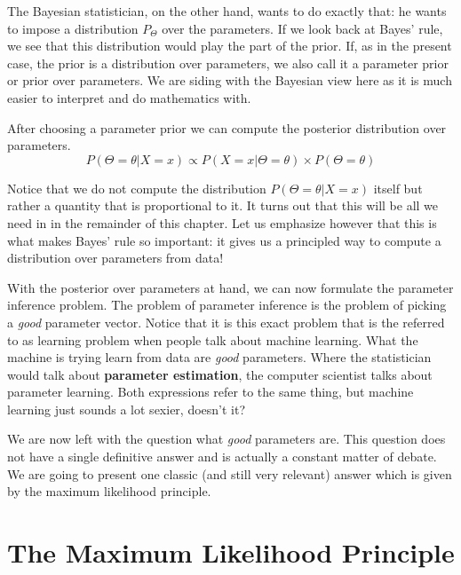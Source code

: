 The Bayesian statistician, on the other hand, wants to do exactly that: he wants to impose a distribution $ P_{\Theta} $ over the parameters. 
If we look back at Bayes' rule, we see that this distribution would play the part of the prior. If, as in the present case, the prior is a distribution over parameters,
we also call it a parameter prior or prior over parameters. We are siding with the Bayesian view here as it is much easier to interpret and do mathematics with.

After choosing a parameter prior we can compute the posterior distribution over parameters.
\begin{equation}
P(\Theta = \theta|X =x) \propto P(X=x|\Theta = \theta) \times P(\Theta = \theta)
\end{equation}

Notice that we do not compute the distribution $ P(\Theta = \theta|X =x) $ itself but rather a quantity that is proportional to it. It turns out that this will be all
we need in in the remainder of this chapter. Let us emphasize however that this is what makes Bayes' rule so important: it gives us a principled way to compute a
distribution over parameters from data!

With the posterior over parameters at hand, we can now formulate the parameter inference problem. The problem of parameter inference is the problem of picking
a \emph{good} parameter vector. Notice that it is this exact problem that is the referred to as learning
problem when people talk about machine learning. What the machine is trying learn from data are \emph{good} parameters. Where the statistician would talk about
\textbf{parameter estimation}, the computer scientist talks about parameter learning. Both expressions refer to the same thing, but machine learning just sounds a lot
sexier, doesn't it?

We are now left with the question what \emph{good} parameters are. This question does not have a single definitive answer and is actually a constant matter of debate. We
are going to present one classic (and still very relevant) answer which is given by the maximum likelihood principle.


\section{The Maximum Likelihood Principle}


